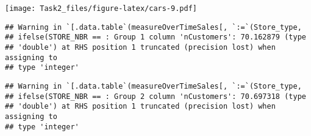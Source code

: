 \documentclass[
]{article}
\newenvironment{Shaded}{\begin{snugshade}}{\end{snugshade}}
\newcommand{\DataTypeTok}[1]{\textcolor[rgb]{0.13,0.29,0.53}{#1}}
\newcommand{\DecValTok}[1]{\textcolor[rgb]{0.00,0.00,0.81}{#1}}
\newcommand{\ErrorTok}[1]{\textcolor[rgb]{0.64,0.00,0.00}{\textbf{#1}}}
\newcommand{\KeywordTok}[1]{\textcolor[rgb]{0.13,0.29,0.53}{\textbf{#1}}}
\newcommand{\NormalTok}[1]{#1}
\newcommand{\OperatorTok}[1]{\textcolor[rgb]{0.81,0.36,0.00}{\textbf{#1}}}
\newcommand{\StringTok}[1]{\textcolor[rgb]{0.31,0.60,0.02}{#1}}
\begin{document}
\texttt{[image: Task2\_files/figure-latex/cars-9.pdf]}

\begin{Shaded}
\end{Shaded}

\begin{verbatim}
## Warning in `[.data.table`(measureOverTimeSales[, `:=`(Store_type,
## ifelse(STORE_NBR == : Group 1 column 'nCustomers': 70.162879 (type
## 'double') at RHS position 1 truncated (precision lost) when assigning to
## type 'integer'
\end{verbatim}

\begin{verbatim}
## Warning in `[.data.table`(measureOverTimeSales[, `:=`(Store_type,
## ifelse(STORE_NBR == : Group 2 column 'nCustomers': 70.697318 (type
## 'double') at RHS position 1 truncated (precision lost) when assigning to
## type 'integer'
\end{verbatim}
\end{document}
